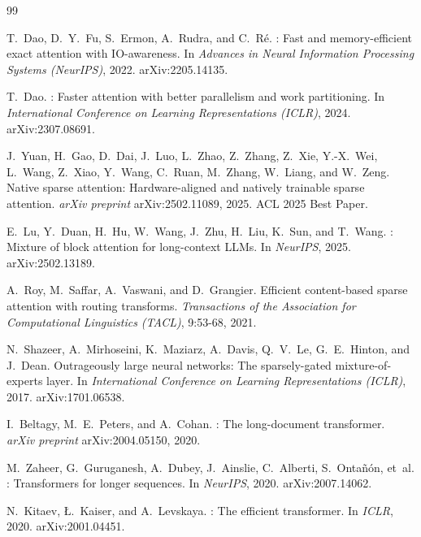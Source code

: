 \documentclass[10pt,letterpaper]{article}
\begin{document}

\begin{thebibliography}{99}

T.~Dao, D.~Y.~Fu, S.~Ermon, A.~Rudra, and C.~R\'e.
: Fast and memory-efficient exact attention with
  {IO}-awareness.
\newblock In \emph{Advances in Neural Information Processing Systems
  (NeurIPS)}, 2022. arXiv:2205.14135.

T.~Dao.
: Faster attention with better parallelism and work
  partitioning.
\newblock In \emph{International Conference on Learning Representations
  (ICLR)}, 2024. arXiv:2307.08691.

J.~Yuan, H.~Gao, D.~Dai, J.~Luo, L.~Zhao, Z.~Zhang, Z.~Xie, Y.-X.~Wei,
  L.~Wang, Z.~Xiao, Y.~Wang, C.~Ruan, M.~Zhang, W.~Liang, and W.~Zeng.
\newblock Native sparse attention: Hardware-aligned and natively trainable
  sparse attention.
\newblock \emph{arXiv preprint} arXiv:2502.11089, 2025. ACL 2025 Best Paper.

E.~Lu, Y.~Duan, H.~Hu, W.~Wang, J.~Zhu, H.~Liu, K.~Sun, and T.~Wang.
: Mixture of block attention for long-context {LLMs}.
\newblock In \emph{NeurIPS}, 2025. arXiv:2502.13189.

A.~Roy, M.~Saffar, A.~Vaswani, and D.~Grangier.
\newblock Efficient content-based sparse attention with routing transforms.
\newblock \emph{Transactions of the Association for Computational Linguistics
  (TACL)}, 9:53-68, 2021.

N.~Shazeer, A.~Mirhoseini, K.~Maziarz, A.~Davis, Q.~V.~Le, G.~E.~Hinton, and
  J.~Dean.
\newblock Outrageously large neural networks: The sparsely-gated
  mixture-of-experts layer.
\newblock In \emph{International Conference on Learning Representations
  (ICLR)}, 2017. arXiv:1701.06538.

I.~Beltagy, M.~E.~Peters, and A.~Cohan.
: The long-document transformer.
\newblock \emph{arXiv preprint} arXiv:2004.05150, 2020.

M.~Zaheer, G.~Guruganesh, A.~Dubey, J.~Ainslie, C.~Alberti, S.~Onta\~{n}\'on,
  et~al.
: Transformers for longer sequences.
\newblock In \emph{NeurIPS}, 2020. arXiv:2007.14062.

N.~Kitaev, \L.~Kaiser, and A.~Levskaya.
: The efficient transformer.
\newblock In \emph{ICLR}, 2020. arXiv:2001.04451.


\end{thebibliography}
\end{document}
